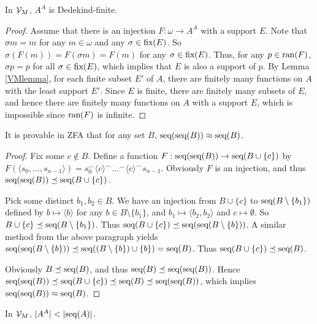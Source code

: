 \begin{lemma}\label{VMadd}
   In $\mathcal{V}_{M}$, $A^{A}$ is Dedekind-finite. 
\end{lemma}

\begin{proof}
Assume that there is an injection $F:\omega\to A^{A}$ with a support $E$. Note that $\sigma m=m$ for any $m\in\omega$ and any $\sigma\in\textup{fix}(E)$. So $\sigma (F(m))=F(\sigma m)=F(m)$ for any $\sigma\in\textup{fix}(E)$. Thus, for any $p\in\textup{ran}(F)$, $\sigma p=p$ for all $\sigma\in\textup{fix}(E)$, which implies that $E$ is also a support of $p$. By Lemma \ref{VMlemma}, for each finite subset $E'$ of $A$, there are finitely many functions on $A$ with the least support $E'$. Since $E$ is finite, there are finitely many subsets of $E$, and hence there are finitely many functions on $A$ with a support $E$, which is impossible since $\textup{ran}(F)$ is infinite.
\end{proof}

\begin{theorem}\label{seqseq}
 It is provable in \textup{ZFA} that for any set $B$, $\textup{seq}(\textup{seq}(B))\approx\textup{seq}(B)$.
\end{theorem}

\begin{proof}
Fix some $c\not\in B$. Define a function $F:\textup{seq}(\textup{seq}(B))\to\textup{seq}(B\cup\{c\})$ by $F(\langle s_{0},...,s_{n-1}\rangle)=s_{0}^{\frown}\langle c\rangle^{\frown}...^{\frown}\langle c\rangle^{\frown}s_{n-1}$. Obviously $F$ is an injection, and thus $\textup{seq}(\textup{seq}(B))\preceq\textup{seq}(B\cup\{c\})$. 

Pick some distinct $b_{1},b_{2}\in B$. We have an injection from $B\cup\{c\}$ to $\textup{seq}(B\setminus\{b_{1}\})$ defined by $b\mapsto\langle b\rangle$ for any $b\in B\setminus\{b_{1}\}$, and $b_{1}\mapsto \langle b_{2},b_{2}\rangle$ and $c\mapsto\emptyset$. So $B\cup\{c\}\preceq\textup{seq}(B\setminus\{b_{1}\})$. Thus $\textup{seq}(B\cup\{c\})\preceq\textup{seq}(\textup{seq}(B\setminus\{b\}))$. A similar method from the above paragraph yields $\textup{seq}(\textup{seq}(B\setminus\{b\}))\preceq\textup{seq}((B\setminus\{b\})\cup\{b\})=\textup{seq}(B)$. Thus $\textup{seq}(B\cup\{c\})\preceq\textup{seq}(B)$.


Obviously $B\preceq\textup{seq}(B)$, and thus $\textup{seq}(B)\preceq\textup{seq}(\textup{seq}(B))$. Hence $\textup{seq}(\textup{seq}(B))\preceq\textup{seq}(B\cup\{c\})\preceq\textup{seq}(B)\preceq\textup{seq}(\textup{seq}(B))$, which implies $\textup{seq}(\textup{seq}(B))\approx\textup{seq}(B)$.
\end{proof}

\begin{theorem}\label{VMprelast}
In $\mathcal{V}_{M}$, $|A^{A}| < |\textup{seq}(A)|$.
\end{theorem}

